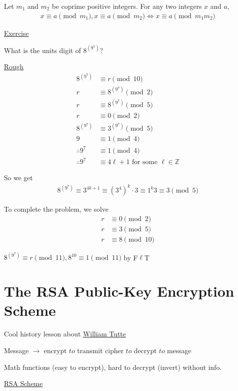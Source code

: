 \documentclass{article}
\begin{document}
Let $m_1$ and $m_2$ be coprime positive integers. For any two integers $x$ and $a$,
\begin{align*}
    x \equiv a \pmod{m_1}, x \equiv a \pmod{m_2} \iff x \equiv a \pmod{m_1m_2}
\end{align*}

\underline{Exercise}

What is the units digit of $8^{(9^{7})}$?

\underline{Rough}
\begin{align*}
    8^{(9^{7})} &\equiv r \pmod{10}\\
    r &\equiv 8^{(9^{7})} \pmod{2}\\
    r &\equiv 8^{(9^{7})} \pmod{5} \\
    r &\equiv 0 \pmod{2} \\
    8^{(9^{7})} &\equiv 3^{(9^{7})} \pmod{5}\\
    9 &\equiv 1 \pmod{4}\\
    \therefore 9^7 &\equiv 1 \pmod{4}\\
    \therefore 9^7 &\equiv 4\ell + 1 \text{ for some } \ell \in \mathbb{Z}
\end{align*}

So we get 
\begin{align*}
    8^{(9^{7})} \equiv 3^{4k+1} \equiv (3^4)^k \cdot 3 \equiv 1^k 3 \equiv 3 \pmod{5}
\end{align*}

To complete the problem, we solve
\begin{align*}
    r &\equiv 0 \pmod{2}\\
    r &\equiv 3 \pmod{5} \\
    r &\equiv 8 \pmod{10}
\end{align*}

$8^{(9^{7})} \equiv r \pmod{11}, 8^{10} \equiv 1 \pmod{11}$ by F$\ell$T


\section{The RSA Public-Key Encryption Scheme}

Cool history lesson about \href{https://uwaterloo.ca/magazine/spring-2015/features/keeping-secrets}{William Tutte}

Message $\to$ encrypt $to$ transmit cipher $to$ decrypt $to$ message

Math functions (easy to encrypt), hard to decrypt (invert) without info. 

\underline{RSA Scheme}
\end{document}
